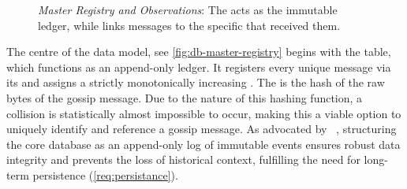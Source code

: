 \begin{figure}[H]
    \caption{
        \textit{Master Registry and Observations}: The  
        acts as the immutable ledger, while  links 
        messages to the specific  that received them.
    }
    \label{fig:db-master-registry}
\end{figure}

The centre of the data model, see \autoref{fig:db-master-registry} begins with 
the  table, which functions as an append-only ledger. 
It registers every unique message via its  and assigns a strictly monotonically increasing . 
The  is the  hash of the raw bytes of the gossip message. 
Due to the nature of this hashing function, a collision is statistically almost impossible to occur,
making this a viable option to uniquely identify and reference a gossip message.
As advocated by \citeauthor{kleppmann_designing_2017}~\cite[Chapter~3]{kleppmann_designing_2017}, 
structuring the core database as an append-only log of immutable events ensures 
robust data integrity and prevents the loss of historical context, 
fulfilling the need for long-term persistence (\ref{req:persistance}).


